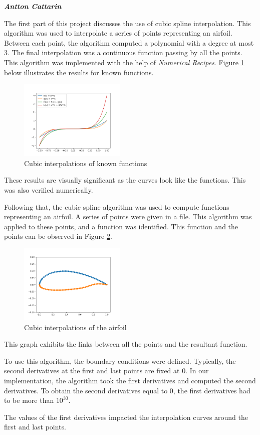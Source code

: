 \large \emph{\textbf{Antton Cattarin}}

The first part of this project discusses the use of cubic spline interpolation. This algorithm was used to interpolate a series of points representing an airfoil. Between each point, the algorithm computed a polynomial with a degree at most 3. The final interpolation was a continuous function passing by all the points. This algorithm was implemented with the help of \emph{Numerical Recipes}. Figure \ref{fig:interp} below illustrates the results for known functions.

\begin{figure}[h]
  \centering
  \includegraphics[width=0.45\textwidth]{img/interpolations.png}
  \caption{Cubic interpolations of known functions}
  \label{fig:interp}
\end{figure}

These results are visually significant as the curves look like the functions. This was also verified numerically.

\bigskip


Following that, the cubic spline algorithm was used to compute functions representing an airfoil. A series of points were given in a file. This algorithm was applied to these points, and a function was identified. This function and the points can be observed in Figure \ref{fig:airfoil}.

\begin{figure}[h]
  \centering
  \includegraphics[width=0.45\textwidth]{img/airfoil_interp.png}
  \caption{Cubic interpolations of the airfoil}
  \label{fig:airfoil}
\end{figure}
  
This graph exhibits the links between all the points and the resultant function.

\bigskip

To use this algorithm, the boundary conditions were defined. Typically, the second derivatives at the first and last points are fixed at 0. In our implementation, the algorithm took the first derivatives and computed the second derivatives. To obtain the second derivatives equal to 0, the first derivatives had to be more than $10^{30}$.

The values of the first derivatives impacted the interpolation curves around the first and last points.
